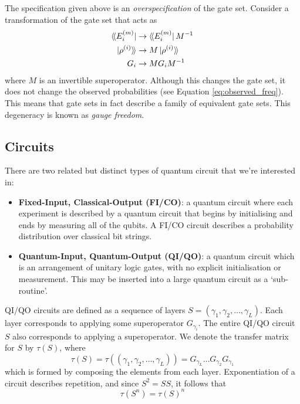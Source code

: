 The specification given above is an \textit{overspecification} of the gate set. Consider a
transformation of the gate set that acts as
\begin{equation} \label{eq:gauge_freedom}
    \begin{aligned}
        \langle\!\bra{E_i^{(m)}}  &\to \langle\!\bra{E_i^{(m)}} M^{-1} \\
        \ket{\rho^{(i)}}\!\rangle &\to M \ket{\rho^{(i)}}\!\rangle \\
        G_i                   &\to M G_i M^{-1}
    \end{aligned}
\end{equation}
where $M$ is an invertible superoperator. Although this changes the gate set, it does not change the
observed probabilities (see Equation \ref{eq:observed_freq}). This means that gate sets in fact
describe a family of equivalent gate sets. This degeneracy is known as \textit{gauge freedom}.

\subsection{Circuits}

There are two related but distinct types of quantum circuit that we're interested in:
\begin{itemize}
    \item \textbf{Fixed-Input, Classical-Output (FI/CO)}: a quantum circuit where each experiment is
    described by a quantum circuit that begins by initialising and ends by measuring all of the
    qubits. A FI/CO circuit describes a probability distribution over classical bit strings.
    \item \textbf{Quantum-Input, Quantum-Output (QI/QO)}: a quantum circuit which is an arrangement
    of unitary logic gates, with no explicit initialisation or measurement. This may be inserted
    into a large quantum circuit as a `sub-routine'.
\end{itemize}

QI/QO circuits are defined as a sequence of layers $S = (\gamma_1, \gamma_2, \dots, \gamma_L)$. Each
layer corresponds to applying some superoperator $G_{\gamma_i}$. The entire QI/QO circuit $S$ also
corresponds to applying a superoperator. We denote the transfer matrix for $S$ by $\tau(S)$, where
\begin{equation}
    \tau(S) = \tau((\gamma_1, \gamma_2, \dots, \gamma_L)) = G_{\gamma_L} \dots G_{\gamma_2} G_{\gamma_1}
\end{equation}
which is formed by composing the elements from each layer. Exponentiation of a circuit describes
repetition, and since $S^2 = SS$, it follows that
\begin{equation}
    \tau(S^n) = \tau(S)^n
\end{equation}

